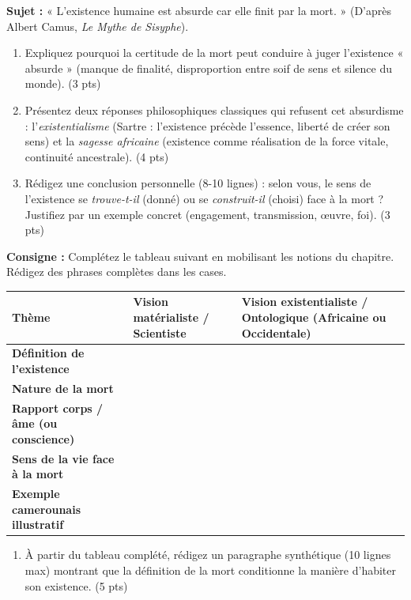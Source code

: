 \documentclass[11pt]{article}
\begin{document}
\begin{exercice}
\textbf{Sujet :} « L'existence humaine est absurde car elle finit par la mort. » (D'après Albert Camus, \textit{Le Mythe de Sisyphe}).
\begin{enumerate}
    \item Expliquez pourquoi la certitude de la mort peut conduire à juger l'existence « absurde » (manque de finalité, disproportion entre soif de sens et silence du monde). (3 pts)
    \item Présentez deux réponses philosophiques classiques qui refusent cet absurdisme : l'\textit{existentialisme} (Sartre : l'existence précède l'essence, liberté de créer son sens) et la \textit{sagesse africaine} (existence comme réalisation de la force vitale, continuité ancestrale). (4 pts)
    \item Rédigez une conclusion personnelle (8-10 lignes) : selon vous, le sens de l'existence se \textit{trouve-t-il} (donné) ou se \textit{construit-il} (choisi) face à la mort ? Justifiez par un exemple concret (engagement, transmission, œuvre, foi). (3 pts)
\end{enumerate}
\end{exercice}

\begin{exercice}
\textbf{Consigne :} Complétez le tableau suivant en mobilisant les notions du chapitre. Rédigez des phrases complètes dans les cases.
\begin{center}
\begin{tabularx}{\linewidth}{|>{\bfseries}X|X|X|}
\hline
\textbf{Thème} & \textbf{Vision matérialiste / Scientiste} & \textbf{Vision existentialiste / Ontologique (Africaine ou Occidentale)} \\
\hline
Définition de l'existence &  &  \\
\hline
Nature de la mort &  &  \\
\hline
Rapport corps / âme (ou conscience) &  &  \\
\hline
Sens de la vie face à la mort &  &  \\
\hline
Exemple camerounais illustratif &  &  \\
\hline
\end{tabularx}
\end{center}
\begin{enumerate}
    \item À partir du tableau complété, rédigez un paragraphe synthétique (10 lignes max) montrant que la définition de la mort conditionne la manière d'habiter son existence. (5 pts)
\end{enumerate}
\end{exercice}
\end{document}
